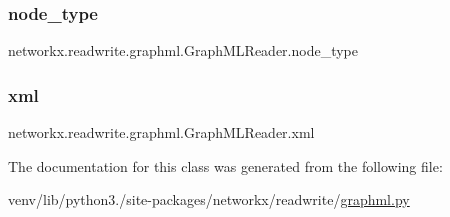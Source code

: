 \subsubsection{\texorpdfstring{node\+\_\+type}{node\_type}}
{\footnotesize\ttfamily networkx.\+readwrite.\+graphml.\+Graph\+M\+L\+Reader.\+node\+\_\+type}

\mbox{\label{classnetworkx_1_1readwrite_1_1graphml_1_1GraphMLReader_ad7f9c068c88d3b8e9330eb400e52e8c2}} 
\subsubsection{\texorpdfstring{xml}{xml}}
{\footnotesize\ttfamily networkx.\+readwrite.\+graphml.\+Graph\+M\+L\+Reader.\+xml}



The documentation for this class was generated from the following file\+:\begin{DoxyCompactItemize}
\item 
venv/lib/python3./site-\/packages/networkx/readwrite/\hyperlink{graphml_8py}{graphml.\+py}\end{DoxyCompactItemize}
